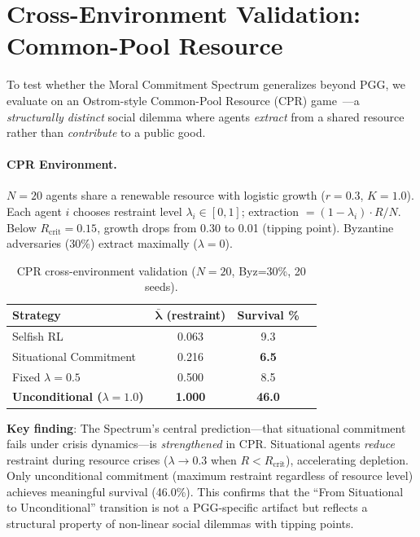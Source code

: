 \documentclass{article}
\begin{document}
\section{Cross-Environment Validation: Common-Pool Resource}
\label{app:cpr}

To test whether the Moral Commitment Spectrum generalizes beyond PGG, we evaluate on an Ostrom-style Common-Pool Resource (CPR) game~\citep{ostrom1990governing}---a \emph{structurally distinct} social dilemma where agents \emph{extract} from a shared resource rather than \emph{contribute} to a public good.

\paragraph{CPR Environment.} $N{=}20$ agents share a renewable resource with logistic growth ($r{=}0.3$, $K{=}1.0$). Each agent $i$ chooses restraint level $\lambda_i \in [0,1]$; extraction $= (1-\lambda_i) \cdot R/N$. Below $R_{\text{crit}}{=}0.15$, growth drops from 0.30 to 0.01 (tipping point). Byzantine adversaries ($30\%$) extract maximally ($\lambda{=}0$).

\begin{table}[h]
\centering
\caption{CPR cross-environment validation ($N{=}20$, Byz=30\%, 20 seeds).}
\label{tab:cpr}
\begin{tabular}{lccc}
\toprule
\textbf{Strategy} & $\boldsymbol{\bar{\lambda}}$ (restraint) & \textbf{Survival \%} \\
\midrule
Selfish RL & 0.063 & 9.3 \\
Situational Commitment & 0.216 & \textbf{6.5} \\
Fixed $\lambda=0.5$ & 0.500 & 8.5 \\
\textbf{Unconditional ($\lambda=1.0$)} & \textbf{1.000} & \textbf{46.0} \\
\bottomrule
\end{tabular}
\end{table}

\noindent \textbf{Key finding}: The Spectrum's central prediction---that situational commitment fails under crisis dynamics---is \emph{strengthened} in CPR. Situational agents \emph{reduce} restraint during resource crises ($\lambda \to 0.3$ when $R < R_{\text{crit}}$), accelerating depletion. Only unconditional commitment (maximum restraint regardless of resource level) achieves meaningful survival (46.0\%). This confirms that the ``From Situational to Unconditional'' transition is not a PGG-specific artifact but reflects a structural property of non-linear social dilemmas with tipping points.
\end{document}
